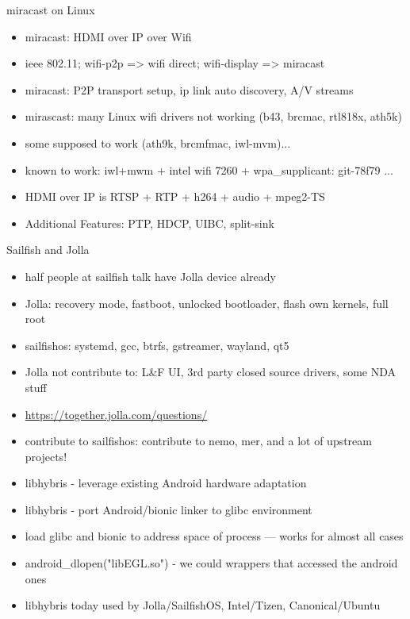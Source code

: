 \documentclass[aspectratio=169]{beamer}
\begin{document}
\begin{frame}{miracast on Linux}
  \begin{itemize}
  \item miracast: HDMI over IP over Wifi
  \item ieee 802.11; wifi-p2p => wifi direct; wifi-display => miracast
  \item miracast: P2P transport setup, ip link auto discovery, A/V streams
  \item mirascast: many Linux wifi drivers not working (b43, brcmac, rtl818x, ath5k)
  \item some supposed to work (ath9k, brcmfmac, iwl-mvm)...
  \item known to work: iwl+mwm + intel wifi 7260 + wpa\_supplicant: git-78f79 ...
  \item HDMI over IP is RTSP + RTP + h264 + audio + mpeg2-TS
  \item Additional Features: PTP, HDCP, UIBC, split-sink
  \end{itemize}
\end{frame}

\begin{frame}{Sailfish and Jolla}
  \begin{itemize}
  \item half people at sailfish talk have Jolla device already
  \item Jolla: recovery mode, fastboot, unlocked bootloader, flash own kernels, full root
  \item sailfishos: systemd, gcc, btrfs, gstreamer, wayland, qt5
  \item Jolla not contribute to: L\&F UI, 3rd party closed source drivers, some NDA stuff
  \item \url{https://together.jolla.com/questions/} 
  \item contribute to sailfishos: contribute to nemo, mer, and a lot of upstream projects!
  \item libhybris - leverage existing Android hardware adaptation
  \item libhybris - port Android/bionic linker to glibc environment
  \item load glibc and bionic to address space of process --- works for almost all cases
  \item android\_dlopen("libEGL.so") - we could wrappers that accessed the android ones
  \item libhybris today used by Jolla/SailfishOS, Intel/Tizen, Canonical/Ubuntu
  \end{itemize}
\end{frame}  
  
\end{document}
